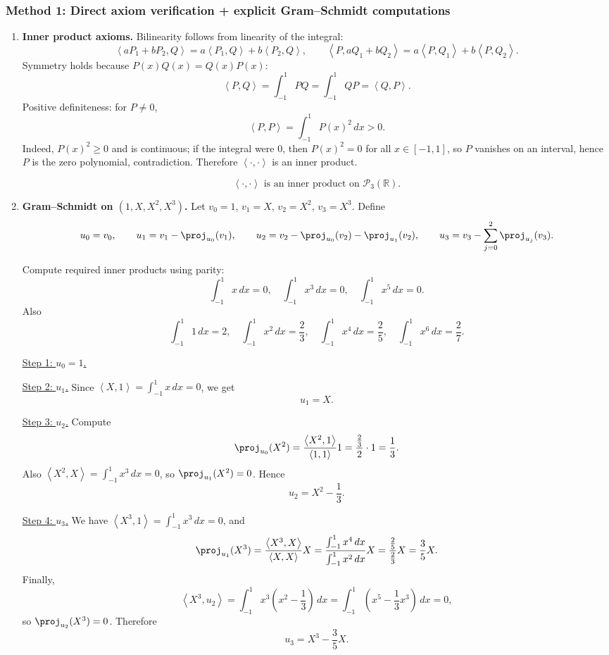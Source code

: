 \documentclass[12pt]{article}
\newcommand{\R}{\mathbb{R}}
\newcommand{\cP}{\mathcal{P}}
\newcommand{\ip}[2]{\left\langle #1,#2\right\rangle}
\begin{document}
\subsubsection{Method 1: Direct axiom verification + explicit Gram--Schmidt computations}
\begin{enumerate}[label=(\alph*)]
\item \textbf{Inner product axioms.}
Bilinearity follows from linearity of the integral:
\[
\ip{aP_1+bP_2}{Q}=a\ip{P_1}{Q}+b\ip{P_2}{Q},\qquad
\ip{P}{aQ_1+bQ_2}=a\ip{P}{Q_1}+b\ip{P}{Q_2}.
\]
Symmetry holds because $P(x)Q(x)=Q(x)P(x)$:
\[
\ip{P}{Q}=\int_{-1}^1 P Q=\int_{-1}^1 Q P=\ip{Q}{P}.
\]
Positive definiteness: for $P\neq 0$,
\[
\ip{P}{P}=\int_{-1}^1 P(x)^2\,dx>0.
\]
Indeed, $P(x)^2\ge 0$ and is continuous; if the integral were $0$, then $P(x)^2=0$ for all $x\in[-1,1]$, so $P$ vanishes on an interval,
hence $P$ is the zero polynomial, contradiction. Therefore $\ip{\cdot}{\cdot}$ is an inner product.

\[
\boxed{\,\ip{\cdot}{\cdot}\text{ is an inner product on }\cP_3(\R).\,}
\]

\item \textbf{Gram--Schmidt on $(1,X,X^2,X^3)$.}
Let $v_0=1$, $v_1=X$, $v_2=X^2$, $v_3=X^3$.
Define
\[
u_0=v_0,\qquad
u_1=v_1-\proj_{u_0}(v_1),\qquad
u_2=v_2-\proj_{u_0}(v_2)-\proj_{u_1}(v_2),\qquad
u_3=v_3-\sum_{j=0}^{2}\proj_{u_j}(v_3).
\]

Compute required inner products using parity:
\[
\int_{-1}^1 x\,dx=0,\quad \int_{-1}^1 x^3\,dx=0,\quad \int_{-1}^1 x^5\,dx=0.
\]
Also
\[
\int_{-1}^1 1\,dx=2,\quad \int_{-1}^1 x^2\,dx=\frac{2}{3},\quad \int_{-1}^1 x^4\,dx=\frac{2}{5},\quad \int_{-1}^1 x^6\,dx=\frac{2}{7}.
\]

\underline{Step 1: $u_0=1$.}

\underline{Step 2: $u_1$.}
Since $\ip{X}{1}=\int_{-1}^1 x\,dx=0$, we get
\[
u_1=X.
\]

\underline{Step 3: $u_2$.}
Compute
\[
\proj_{u_0}(X^2)=\frac{\ip{X^2}{1}}{\ip{1}{1}}1=\frac{\frac{2}{3}}{2}\cdot 1=\frac{1}{3}.
\]
Also $\ip{X^2}{X}=\int_{-1}^1 x^3\,dx=0$, so $\proj_{u_1}(X^2)=0$.
Hence
\[
u_2=X^2-\frac{1}{3}.
\]

\underline{Step 4: $u_3$.}
We have $\ip{X^3}{1}=\int_{-1}^1 x^3\,dx=0$, and
\[
\proj_{u_1}(X^3)=\frac{\ip{X^3}{X}}{\ip{X}{X}}X
=\frac{\int_{-1}^1 x^4\,dx}{\int_{-1}^1 x^2\,dx}X
=\frac{\frac{2}{5}}{\frac{2}{3}}X=\frac{3}{5}X.
\]
Finally,
\[
\ip{X^3}{u_2}=\int_{-1}^1 x^3\left(x^2-\frac13\right)\,dx
=\int_{-1}^1 \left(x^5-\frac13 x^3\right)\,dx=0,
\]
so $\proj_{u_2}(X^3)=0$. Therefore
\[
u_3=X^3-\frac{3}{5}X.
\]


\end{enumerate}
\end{document}
